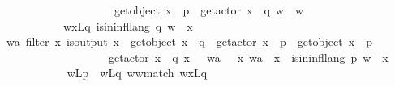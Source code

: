 \begin{isabellebody}
\ \ \ \ \ \ \ \ \ \ \ \ \ \ \ \ \ \ \ {\isasymor}\ get{\isacharunderscore}{\kern0pt}object\ x\ {\isacharequal}{\kern0pt}\ p\ {\isasymand}\ get{\isacharunderscore}{\kern0pt}actor\ x\ {\isacharequal}{\kern0pt}\ q{\isacharparenright}{\kern0pt}{\isacharparenright}{\kern0pt}\ w{\isacharprime}{\kern0pt}{\isasymdown}\isactrlsub {\isacharbang}{\kern0pt}\isactrlsub {\isacharquery}{\kern0pt}\ {\isacharequal}{\kern0pt}\ w{\isasymdown}\isactrlsub {\isacharquery}{\kern0pt}{\isasymdown}\isactrlsub {\isacharbang}{\kern0pt}\isactrlsub {\isacharquery}{\kern0pt}{\isachardoublequoteclose}\isanewline
\ \ \ \ \ \ \ \ \ \ \ w{\isacharprime}{\kern0pt}x{\isacharprime}{\kern0pt}{\isacharunderscore}{\kern0pt}Lq{\isacharcolon}{\kern0pt}\ {\isachardoublequoteopen}is{\isacharunderscore}{\kern0pt}in{\isacharunderscore}{\kern0pt}infl{\isacharunderscore}{\kern0pt}lang\ q\ {\isacharparenleft}{\kern0pt}w{\isacharprime}{\kern0pt}\ {\isasymsqdot}\ x{\isacharprime}{\kern0pt}{\isacharparenright}{\kern0pt}{\isachardoublequoteclose}\isanewline
\ \ \ \ \ \ \ \ \isamarkupfalse%
\ \isamarkupfalse%
\ {\isachardoublequoteopen}{\isasymexists}wa{\isachardot}{\kern0pt}\ filter\ {\isacharparenleft}{\kern0pt}{\isasymlambda}x{\isachardot}{\kern0pt}\ is{\isacharunderscore}{\kern0pt}output\ x\ {\isasymand}\ {\isacharparenleft}{\kern0pt}get{\isacharunderscore}{\kern0pt}object\ x\ {\isacharequal}{\kern0pt}\ q\ {\isasymand}\ get{\isacharunderscore}{\kern0pt}actor\ x\ {\isacharequal}{\kern0pt}\ p\ {\isasymor}\ get{\isacharunderscore}{\kern0pt}object\ x\ {\isacharequal}{\kern0pt}\ p\ {\isasymand}\isanewline
\ \ \ \ \ \ \ \ \ \ \ \ \ \ \ \ \ \ \ get{\isacharunderscore}{\kern0pt}actor\ x\ {\isacharequal}{\kern0pt}\ q{\isacharparenright}{\kern0pt}{\isacharparenright}{\kern0pt}\ x{\isacharprime}{\kern0pt}{\isasymdown}\isactrlsub {\isacharbang}{\kern0pt}\isactrlsub {\isacharquery}{\kern0pt}\ {\isacharequal}{\kern0pt}\ \ wa{\isasymdown}\isactrlsub {\isacharbang}{\kern0pt}\isactrlsub {\isacharquery}{\kern0pt}\ {\isasymand}\ \ {\isacharparenleft}{\kern0pt}{\isasymexists}x{\isachardot}{\kern0pt}\ wa\ {\isacharequal}{\kern0pt}\ x{\isasymdown}\isactrlsub {\isacharquery}{\kern0pt}\ {\isasymand}\ is{\isacharunderscore}{\kern0pt}in{\isacharunderscore}{\kern0pt}infl{\isacharunderscore}{\kern0pt}lang\ p\ {\isacharparenleft}{\kern0pt}w\ {\isasymsqdot}\ x{\isacharparenright}{\kern0pt}{\isacharparenright}{\kern0pt}{\isachardoublequoteclose}\ \isanewline
\ \ \ \ \ \ \ \ \ \ \isamarkupfalse%
\ w{\isacharunderscore}{\kern0pt}Lp\ \ w{\isacharprime}{\kern0pt}{\isacharunderscore}{\kern0pt}Lq\ w{\isacharprime}{\kern0pt}{\isacharunderscore}{\kern0pt}w{\isacharunderscore}{\kern0pt}match\ w{\isacharprime}{\kern0pt}x{\isacharprime}{\kern0pt}{\isacharunderscore}{\kern0pt}Lq\isanewline

\end{isabellebody}
